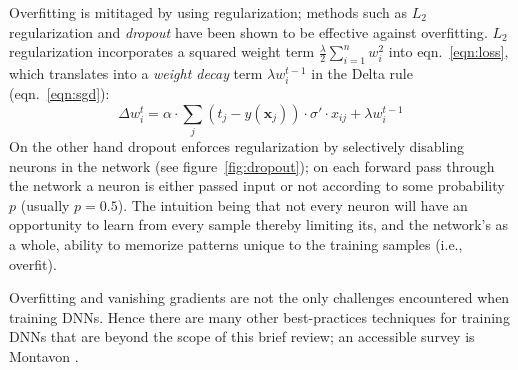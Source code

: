 Overfitting is mititaged by using regularization; methods such as \(L_2\) regularization and \textit{dropout} have been shown to be effective against overfitting\cite{bengio2013}.
%
\(L_2\) regularization incorporates a squared weight term \(\frac{\lambda}{2}\sum_{i=1}^n w_i^2\) into eqn.~\eqref{eqn:loss}, which translates into a \textit{weight decay} term \(\lambda w_i^{t-1}\) in the Delta rule (eqn.~\eqref{eqn:sgd}):
\begin{equation}
    \Delta w_i^t = \alpha \cdot \sum_j (t_j-y(\mathbf{x}_j))\cdot \sigma'\cdot x_{ij} + \lambda w_i^{t-1}
    \label{eqn:weightdecaydelta}
\end{equation}
On the other hand dropout enforces regularization by selectively disabling neurons in the network (see figure~\ref{fig:dropout}); on each forward pass through the network a neuron is either passed input or not according to some probability \(p\) (usually \(p = 0.5\)).
%
The intuition being that not every neuron will have an opportunity to learn from every sample thereby limiting its, and the network's as a whole, ability to memorize patterns unique to the training samples (i.e., overfit).

Overfitting and vanishing gradients are not the only challenges encountered when training DNNs.
%
Hence there are many other best-practices techniques for training DNNs that are beyond the scope of this brief review; an accessible survey is Montavon \etal\cite{montavon2012neural}.
